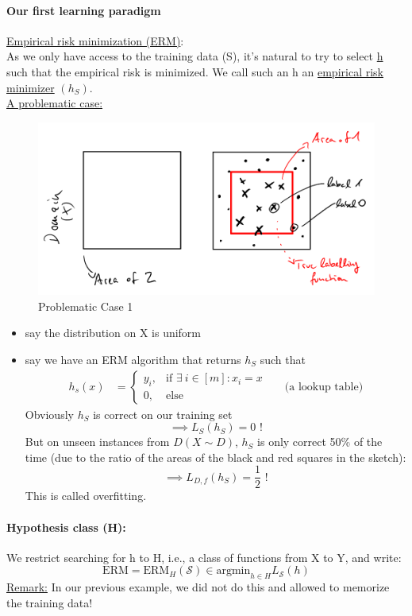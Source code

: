 \documentclass[10pt,a4paper]{article}
\theoremstyle{definition}
\theoremstyle{plain}
\begin{document}
\paragraph{Our first learning paradigm} \underline{Empirical risk minimization (ERM)}:\\
As we only have access to the training data (S), it's natural to try to select \underline{h} such that the empirical risk is minimized. We call such an h an \underline{empirical risk minimizer} $(h_S)$.\\

\underline{A problematic case:}
\begin{figure}[H]
	\centering
	\includegraphics[width=0.7\linewidth]{sketch_1}
	\caption{Problematic Case 1}
	\label{fig:sketch1}
\end{figure}

\begin{itemize}
	\item say the distribution on X is uniform
	\item say we have an ERM algorithm that returns $h_S$ such that 
	\begin{align*}
			 h_s(x) &= \begin{cases}
			y_i , &  \text{if } \exists \ i \in [m]: x_i = x  \\
			0 , &  \text{else} 
		\end{cases} && \text{(a lookup table)} 
	\end{align*}
	Obviously $h_S$ is correct on our training set $$\implies L_S(h_S) = 0\text{ !}$$
	But on unseen instances from $D (X \sim D)$, $h_S$ is only correct 50\% of the time (due to the ratio of the areas of the black and red squares in the sketch): $$\implies L_{D,f}(h_S) = \frac{1}{2} \text{ !}$$
	This is called overfitting.
\end{itemize}

\paragraph{Hypothesis class (H):} We restrict searching for h to H, i.e., a class of functions from X to Y, and write:
$$
\text{ERM} = \text{ERM}_{H} (\mathcal{S}) \in \text{argmin}_{h \in H} L_{\mathcal{S}}(h)
$$
\underline{Remark:} In our previous example, we did not do this and allowed to memorize the training data!
\end{document}
